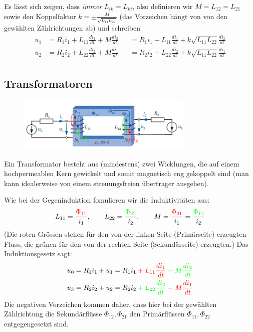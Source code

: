 Es lässt sich zeigen, dass \textit{immer} $L_{ik} = L_{ki}$, also definieren wir $M=L_{12}=L_{21}$ sowie den Koppelfaktor
$k =  \pm\frac{M}{\sqrt{L_{11}L_{22}}}$ (das Vorzeichen hängt von von den gewählten Zählrichtungen ab) und schreiben
\begin{equation*}
	\begin{alignedat}{2}
		u_1 &= R_1i_1 + L_{11}\frac{di_1}{dt}+M\frac{di_2}{dt} &&= R_1i_1 + L_{11}\frac{di_1}{dt}+k\sqrt{L_{11}L_{22}}\frac{di_2}{dt} \\
		u_2 &= R_2i_2 + L_{22}\frac{di_2}{dt}+M\frac{di_1}{dt} &&= R_2i_2 + L_{22}\frac{di_2}{dt}+k\sqrt{L_{11}L_{22}}\frac{di_1}{dt}\\
	\end{alignedat}
\end{equation*}
\pagebreak

\subsection{Transformatoren}
\begin{figure}[H]
	\center
	\vspace{-0.5cm}
	\includegraphics[width=0.75\textwidth]{img/Tra2}
	\vspace{-0.2cm}
\end{figure}
Ein Transformator besteht aus (mindestens) zwei Wicklungen, die auf einem hochpermeablen Kern gewickelt und somit magnetisch eng gekoppelt sind (man kann idealerweise von einem streuungsfreien übertrager ausgehen). \newline

Wie bei der Gegeninduktion fomulieren wir die Induktivitäten aus:
$$ L_{11} = \frac{\color{red}\Phi_{11}}{i_1}, \qquad L_{22}= \frac{\color{green}\Phi_{22}}{i_2}, \qquad
M = \frac{\color{red}\Phi_{21}}{i_1}=\frac{\color{green}\Phi_{12}}{i_2}$$
(Die roten Grössen stehen für den von der linken Seite (Primärseite) erzeugten Fluss, die grünen für den von der rechten Seite (Sekundärseite) erzeugten.) Das Induktionsgesetz sagt:
\begin{equation*}
	\begin{alignedat}{2}
		u_0 &= R_1i_1 + u_1 &&= R_1i_1 \color{red} + L_{11}\frac{di_1}{dt} \color{green} - M\frac{di_2}{dt} \\
		u_3 &= R_2i_2 + u_2 &&= R_2i_2 \color{green} + L_{22}\frac{di_2}{dt} \color{red}-M\frac{di_1}{dt}\\
	\end{alignedat}
\end{equation*}
Die negativen Vorzeichen kommen daher, dass hier bei der gewählten Zählrichtung die Sekundärflüsse $\Phi_{12},\Phi_{21}$ den Primärflüssen $\Phi_{11},\Phi_{22}$ entgegengesetzt sind. \newline


